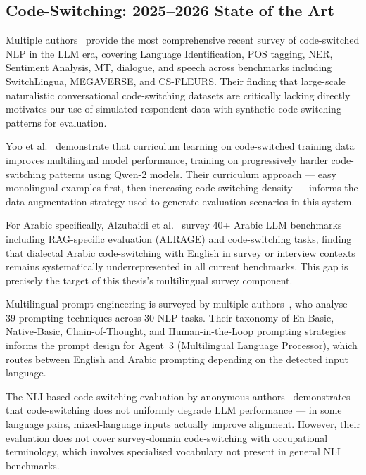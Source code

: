 \subsection{Code-Switching: 2025--2026 State of the Art}

Multiple authors~\cite{multiauth2026cswnlp} provide the most comprehensive
recent survey of code-switched NLP in the LLM era, covering Language
Identification, POS tagging, NER, Sentiment Analysis, MT, dialogue, and speech
across benchmarks including SwitchLingua, MEGAVERSE, and CS-FLEURS.
Their finding that large-scale naturalistic conversational code-switching datasets
are critically lacking directly motivates our use of simulated respondent data
with synthetic code-switching patterns for evaluation.

Yoo et al.~\cite{yoo2025cscl} demonstrate that curriculum learning on
code-switched training data improves multilingual model performance, training
on progressively harder code-switching patterns using Qwen-2 models.
Their curriculum approach --- easy monolingual examples first, then increasing
code-switching density --- informs the data augmentation strategy used to
generate evaluation scenarios in this system.

\noindent For Arabic specifically, Alzubaidi et al.~\cite{alzubaidi2025arabic}
survey 40+ Arabic LLM benchmarks including RAG-specific evaluation (ALRAGE)
and code-switching tasks, finding that dialectal Arabic code-switching with
English in survey or interview contexts remains systematically underrepresented
in all current benchmarks.
This gap is precisely the target of this thesis's multilingual survey component.

Multilingual prompt engineering is surveyed by multiple authors~\cite{multiauth2025mlprompt},
who analyse 39 prompting techniques across 30 NLP tasks.
Their taxonomy of En-Basic, Native-Basic, Chain-of-Thought, and Human-in-the-Loop
prompting strategies informs the prompt design for Agent~3 (Multilingual Language
Processor), which routes between English and Arabic prompting depending on the
detected input language.

The NLI-based code-switching evaluation by anonymous authors~\cite{anon2024cswnli}
demonstrates that code-switching does not uniformly degrade LLM performance ---
in some language pairs, mixed-language inputs actually improve alignment.
However, their evaluation does not cover survey-domain code-switching with
occupational terminology, which involves specialised vocabulary not present
in general NLI benchmarks.

